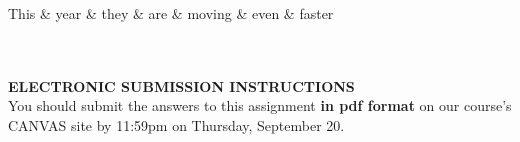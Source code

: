 \documentclass[11pt]{article}
\begin{document}
\begin{enumerate}
\begin{dependency}[edge slant=15pt,label theme = simple, edge theme = iron]
		\end{dependency}

	\vspace{.5in}


	\begin{dependency}[edge slant=15pt,label theme = simple, edge theme = iron]
  	\begin{deptext}[column sep=1em]
    		This \& year \& they \& are \& moving \& even \& faster \\ \\ \\
  	\end{deptext}
	\end{dependency}
	
	\vspace{1in}
	

\end{enumerate}  %


\newpage
\hspace*{1.5in}  {\bf ELECTRONIC SUBMISSION INSTRUCTIONS} \\

You should submit the answers to this assignment {\bf in pdf format}
on our course's CANVAS site by 11:59pm on Thursday, September 20.
\end{document}
